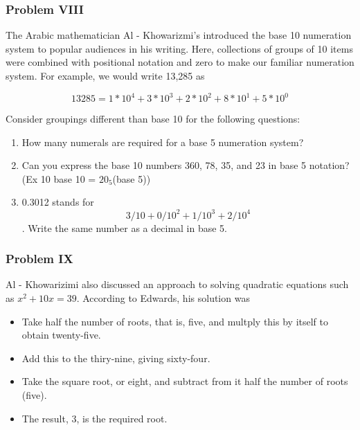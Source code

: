 \documentclass[11pt]{article}
\providecommand{\tightlist}{%
      \setlength{\itemsep}{0pt}\setlength{\parskip}{0pt}}
\begin{document}
    \subsubsection{Problem VIII}\label{problem-viii}

The Arabic mathematician Al - Khowarizmi's introduced the base 10
numeration system to popular audiences in his writing. Here, collections
of groups of 10 items were combined with positional notation and zero to
make our familiar numeration system. For example, we would write 13,285
as

\[13285 = 1*10^4 + 3*10^3 + 2*10^2 + 8*10^1 + 5*10^0\]

Consider groupings different than base 10 for the following questions:

\begin{enumerate}
\def\labelenumi{\arabic{enumi}.}
\tightlist
\item
  How many numerals are required for a base 5 numeration system?
\item
  Can you express the base 10 numbers 360, 78, 35, and 23 in base 5
  notation? (Ex 10 base 10 = \(20_5\)(base 5))
\item
  0.3012 stands for \[3/10 + 0/10^2 + 1/10^3 + 2/10^4\]. Write the same
  number as a decimal in base 5.
\end{enumerate}

    \subsubsection{Problem IX}\label{problem-ix}

Al - Khowarizimi also discussed an approach to solving quadratic
equations such as \(x^2 + 10x = 39\). According to Edwards, his solution
was

\begin{itemize}
\tightlist
\item
  Take half the number of roots, that is, five, and multply this by
  itself to obtain twenty-five.\\
\item
  Add this to the thiry-nine, giving sixty-four.\\
\item
  Take the square root, or eight, and subtract from it half the number
  of roots (five).
\item
  The result, 3, is the required root.
\end{itemize}
\end{document}
